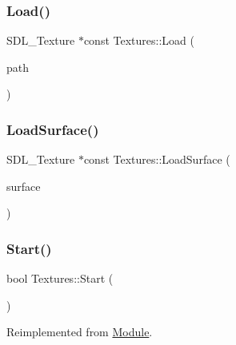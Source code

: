 \mbox{\label{class_textures_a97f7d4971861a4b24b9756d6f85c0424}} 
\subsubsection{\texorpdfstring{Load()}{Load()}}
{\footnotesize\ttfamily S\+D\+L\+\_\+\+Texture $\ast$const Textures\+::\+Load (\begin{DoxyParamCaption}\item[{const char $\ast$}]{path }\end{DoxyParamCaption})}

\mbox{\label{class_textures_ae0e82cc315fb823f23ae1b63c6da5a68}} 
\subsubsection{\texorpdfstring{LoadSurface()}{LoadSurface()}}
{\footnotesize\ttfamily S\+D\+L\+\_\+\+Texture $\ast$const Textures\+::\+Load\+Surface (\begin{DoxyParamCaption}\item[{S\+D\+L\+\_\+\+Surface $\ast$}]{surface }\end{DoxyParamCaption})}

\mbox{\label{class_textures_a15ed80517d40c16e670a9d968ce0944e}} 
\subsubsection{\texorpdfstring{Start()}{Start()}}
{\footnotesize\ttfamily bool Textures\+::\+Start (\begin{DoxyParamCaption}{ }\end{DoxyParamCaption})\hspace{0.3cm}{\ttfamily [virtual]}}



Reimplemented from \mbox{\hyperlink{class_module_aaf67046743296e8de310039a1dc95d86}{Module}}.

\mbox{\label{class_textures_a97ee35678d1bae2eb558c993bc2dce34}} 
